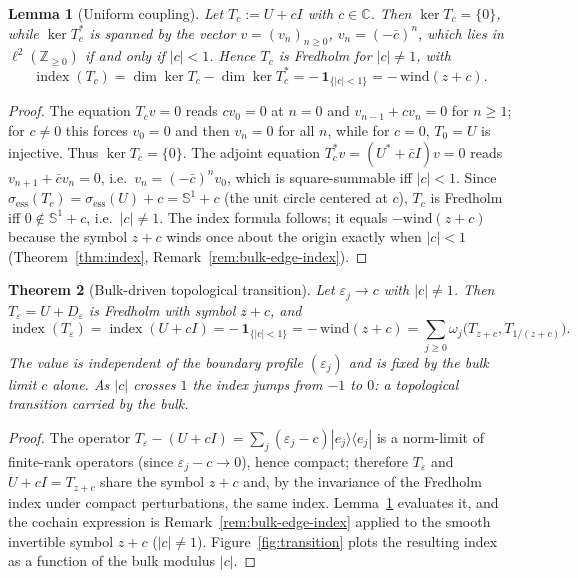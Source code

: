 \documentclass[10pt]{amsart}
\newcommand{\1}{{\mathbb{I}}}
\newcommand{\ind}{\operatorname{index}}
\newtheorem{theorem}{Theorem}[section]
\newtheorem{lemma}[theorem]{Lemma}
\numberwithin{equation}{section}
\begin{document}
\begin{lemma}[Uniform coupling]\label{lem:uniform-index}
Let $T_c:=U+cI$ with $c\in\mathbb{C}$. Then $\ker T_c=\{0\}$, while $\ker T_c^*$ is spanned by the
vector $v=(v_n)_{n\ge0}$, $v_n=(-\bar c)^n$, which lies in $\ell^2(\mathbb{Z}_{\ge 0})$ if and
only if $|c|<1$. Hence $T_c$ is Fredholm for $|c|\ne1$, with
\[
\ind(T_c)=\dim\ker T_c-\dim\ker T_c^*=-\,\mathbf{1}_{\{|c|<1\}}=-\,\mathrm{wind}(z+c).
\]
\end{lemma}

\begin{proof}
The equation $T_c v=0$ reads $cv_0=0$ at $n=0$ and $v_{n-1}+cv_n=0$ for $n\ge1$; for $c\ne0$ this
forces $v_0=0$ and then $v_n=0$ for all $n$, while for $c=0$, $T_0=U$ is injective. Thus
$\ker T_c=\{0\}$. The adjoint equation $T_c^* v=(U^*+\bar c I)v=0$ reads $v_{n+1}+\bar c v_n=0$,
i.e.\ $v_n=(-\bar c)^n v_0$, which is square-summable iff $|c|<1$. Since
$\sigma_{\mathrm{ess}}(T_c)=\sigma_{\mathrm{ess}}(U)+c=\mathbb{S}^1+c$ (the unit circle centered
at $c$), $T_c$ is Fredholm iff $0\notin\mathbb{S}^1+c$, i.e.\ $|c|\ne1$. The index formula
follows; it equals $-\mathrm{wind}(z+c)$ because the symbol $z+c$ winds once about the origin
exactly when $|c|<1$ (Theorem~\ref{thm:index}, Remark~\ref{rem:bulk-edge-index}).
\end{proof}

\begin{theorem}[Bulk-driven topological transition]\label{thm:transition}
Let $\varepsilon_j\to c$ with $|c|\ne1$. Then $T_\varepsilon=U+D_\varepsilon$ is Fredholm with
symbol $z+c$, and
\[
\ind(T_\varepsilon)=\ind(U+cI)=-\,\mathbf{1}_{\{|c|<1\}}
=-\,\mathrm{wind}(z+c)=\sum_{j\ge0}\omega_j\bigl(T_{z+c},T_{1/(z+c)}\bigr).
\]
The value is \emph{independent of the boundary profile} $(\varepsilon_j)$ and is fixed by the
bulk limit $c$ alone. As $|c|$ crosses $1$ the index jumps from $-1$ to $0$: a topological
transition carried by the bulk.
\end{theorem}

\begin{proof}
The operator $T_\varepsilon-(U+cI)=\sum_j(\varepsilon_j-c)|e_j\rangle\langle e_j|$ is a
norm-limit of finite-rank operators (since $\varepsilon_j-c\to0$), hence compact; therefore
$T_\varepsilon$ and $U+cI=T_{z+c}$ share the symbol $z+c$ and, by the invariance of the Fredholm
index under compact perturbations, the same index. Lemma~\ref{lem:uniform-index} evaluates it,
and the cochain expression is Remark~\ref{rem:bulk-edge-index} applied to the smooth invertible
symbol $z+c$ ($|c|\ne1$). Figure~\ref{fig:transition} plots the resulting index as a function
of the bulk modulus $|c|$.
\end{proof}
\end{document}
